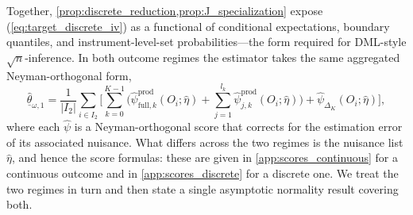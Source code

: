 Together, \cref{prop:discrete_reduction,prop:J_specialization} expose (\ref{eq:target_discrete_iv}) as a functional of conditional expectations, boundary quantiles, and instrument-level-set probabilities---the form required for DML-style $\sqrt{n}$-inference. In both outcome regimes the estimator takes the same aggregated Neyman-orthogonal form,
\begin{equation}\label{eq:estimator_dml}
    \hat{\underline{\theta}}_{\omega, 1} = \frac{1}{|I_2|} \sum_{i \in I_2} \Bigg[ \sum_{k=0}^{K-1}\bigg(\hat{\psi}_{\text{full},k}^{\text{prod}}(O_i; \hat{\eta}) + \sum_{j=1}^{l_k} \hat{\psi}_{j,k}^{\text{prod}}(O_i; \hat{\eta})\bigg) + \hat{\psi}_{\Delta_K}(O_i; \hat{\eta}) \Bigg],
\end{equation}
where each $\hat{\psi}$ is a Neyman-orthogonal score that corrects for the estimation error of its associated nuisance. What differs across the two regimes is the nuisance list $\hat\eta$, and hence the score formulas: these are given in \cref{app:scores_continuous} for a continuous outcome and in \cref{app:scores_discrete} for a discrete one. We treat the two regimes in turn and then state a single asymptotic normality result covering both.

